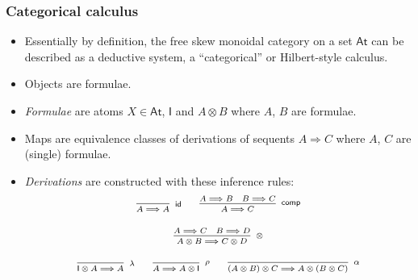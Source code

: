 \documentclass[10pt,t]{beamer}
\newcommand{\I}{\mathsf{I}}
\newcommand{\ot}{\otimes}
\newcommand{\C}{\mathbb{C}}
\newcommand{\al}{\alpha}
\newcommand{\lam}{\lambda}
\newcommand{\Var}{\mathsf{At}}
\newcommand{\tto}{\Longrightarrow}
\newcommand{\id}{\mathsf{id}}
\newcommand{\comp}{\circ}
\newcommand{\dcomp}{\mathsf{comp}}
\newcommand{\e}{\mathsf{e}}
\newcommand{\m}{\mathsf{m}}
\begin{document}

 





\begin{frame}

  \frametitle{Categorical calculus}

\begin{itemize}

\item Essentially by definition, the free skew monoidal category on a
  set $\Var$ can be described as a deductive system, a ``categorical''
  or Hilbert-style calculus.

\medskip

\item Objects are formulae. 

\item \emph{Formulae} are atoms $X \in \Var$, $\I$ and $A \ot B$ where
  $A$, $B$ are formulae.

\medskip

\item Maps are equivalence classes of derivations of sequents
  $A \tto C$ where $A$, $C$ are (single) formulae.

\item \emph{Derivations} are constructed with these inference rules:
\[
\scriptsize
\begin{array}{c}
\infer[\id]{A \tto A}{}
\qquad
\infer[\dcomp]{A \tto C}{A \tto B & B \tto C}
\\[12pt]
\infer[\ot]{A \ot B \tto C \ot D}{A \tto C & B \tto D}
\\[12pt]
\infer[\lam]{\I \ot A \tto A}{}
\qquad
\infer[\rho]{A \tto A \ot \I}{}
\qquad
\infer[\al]{(A \ot B) \ot C \tto A \ot (B \ot C)}{}
\end{array}
\]

\end{itemize}


\end{frame}
\end{document}
